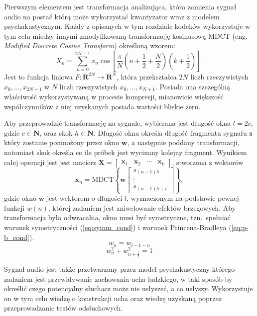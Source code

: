 \documentclass[pl,12pt]{aghdpl}
\begin{document}
Pierwszym elementem jest transformacja analizująca, która zamienia sygnał audio
na postać którą może wykorzystać kwantyzator wraz z modelem psychakustycznym.
Każdy z opisanych w tym rozdziale kodeków wykorzystuje w tym celu miedzy innymi
zmodyfikowaną transformację kosinusową MDCT (eng. \textit{Modified Discrete
Cosine Transform}) określoną wzorem:
\begin{equation}
  X_k = \sum_{n=0}^{2N-1}x_n\cos\left[\frac{\pi}{N}
  \left(n+\frac{1}{2}+\frac{N}{2}\right)\left(k+\frac{1}{2}\right)\right].
\end{equation}
Jest to funkcja liniowa $F\colon \bm{R}^{2N} \to \bm{R}^N$, która przekształca
$2N$ liczb rzeczywistych $x_0, \dotsc, x_{2N+1}$ w $N$ liczb rzeczywistych
$x_0, \dotsc, x_{N+1}$. Posiada ona szczególną właściwość wykorzystywaną w
procesie kompresji, mianowicie większość współczynników z niej uzyskanych
posiada wartości bliskie zeru.

Aby przeprowadzić transformację na sygnale, wybierana jest długość okna $l =
2c$, gdzie $c \in \bm N$, oraz skok $h \in \bm N$. Długość okna określa długość
fragmentu sygnału $\bm s$ który zostanie pomnożony przez okno $\bm w$, a
następnie poddany transformacji, natomiast skok określa co ile próbek jest
wycinany kolejny fragment. Wynikiem całej operacji jest jest macierz $\bm X =
\begin{bmatrix}\bm x_1 & \bm x_2 & \cdots  & \bm x_k\end{bmatrix}$, stworzona z
wektorów \[\bm x_n = \text{MDCT}\left\{\bm
w\begin{bmatrix}s_{(n-1)h}\\\vdots\\s_{(n-1)h+l}\end{bmatrix}\right\},\] gdzie
okno $\bm w$ jest wektorem o długości $l$, wyznaczonym na podstawie pewnej
funkcji $w(n)$, której zadaniem jest zniwelowanie efektów brzegowych. Aby
transformacja była odwracalna, okno musi być symetryczne, tzn.\ spełniać
warunek symetryczności (\ref{eq:symm_cond}) i warunek Princena-Bradleya
(\ref{eq:p-b_cond}).
\begin{equation}\label{eq:symm_cond}
  w_n = w_{l-1-n}
\end{equation}
\begin{equation}\label{eq:p-b_cond}
  w_n^2+w_{n+\frac{l}{2}}^2 = 1
\end{equation}

Sygnał audio jest także przetwarzany przez model psychakustyczny którego
zadaniem jest przewidywanie zachowania ucha ludzkiego, w taki sposób by
określić czego potencjalny słuchacz może nie usłyszeć, a co usłyszy.
Wykorzystuje on w tym celu wiedzę o konstrukcji ucha oraz wiedzę uzyskaną
poprzez przeprowadzanie testów odsłuchowych.
\end{document}
